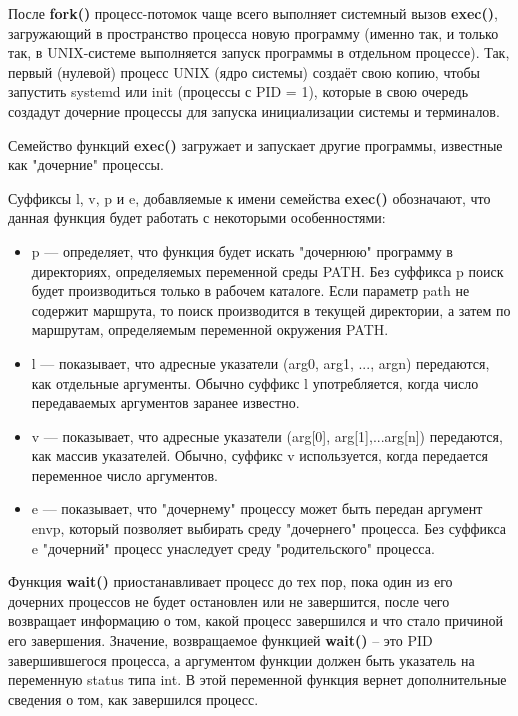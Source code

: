 \documentclass[a4paper]{article}
\begin{document}
	После \textbf{fork()} процесс-потомок чаще всего выполняет системный вызов \textbf{exec()}, загружающий в пространство процесса новую программу (именно так, и только так, в UNIX-системе выполняется запуск программы в отдельном процессе). Так, первый (нулевой) процесс UNIX (ядро системы) создаёт свою копию, чтобы запустить systemd или init (процессы с PID = 1), которые в свою очередь создадут дочерние процессы для запуска инициализации системы и терминалов.
	
	Семейство функций \textbf{exec()} загружает  и  запускает другие    программы, известные как "дочерние" процессы. 
	
	
	Суффиксы l, v, p и e, добавляемые к имени семейства \textbf{exec()} обозначают, что данная функция будет работать с некоторыми особенностями:
	\begin{itemize}
		\item p --- определяет, что функция будет искать "дочернюю" программу в директориях, определяемых переменной среды PATH. Без суффикса p поиск будет  производиться только в рабочем каталоге. Если параметр path  не  содержит  маршрута,  то поиск  производится  в  текущей  директории,  а затем  по  маршрутам,  определяемым  переменной окружения PATH.
		\item l --- показывает, что адресные указатели (arg0, arg1, ..., argn) передаются, как отдельные аргументы. Обычно суффикс l употребляется, когда число передаваемых аргументов заранее известно.
		\item v --- показывает,  что  адресные  указатели  (arg[0], arg[1],...arg[n]) передаются, как массив указателей. Обычно, суффикс  v  используется, когда передается переменное число аргументов.
		\item e --- показывает, что "дочернему" процессу может быть передан аргумент envp, который позволяет выбирать среду "дочернего"   процесса. Без суффикса e "дочерний" процесс унаследует среду "родительского" процесса.
	\end{itemize}
	
	Функция \textbf{wait()} приостанавливает процесс до тех пор, пока один из его дочерних процессов не будет остановлен или не завершится, после чего возвращает информацию о том, какой процесс завершился и что стало причиной его завершения. Значение, возвращаемое функцией \textbf{wait()} – это PID завершившегося процесса, а аргументом функции должен быть указатель на переменную status типа int. В этой переменной функция вернет дополнительные сведения о том, как завершился процесс. 
	
\end{document}

